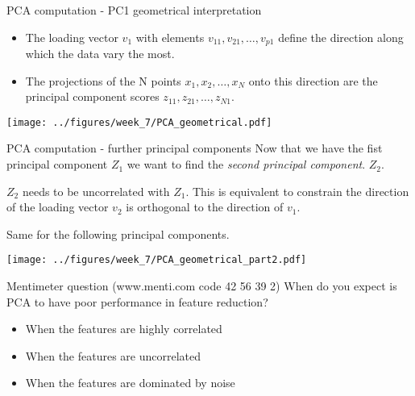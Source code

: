 \documentclass[notes]{beamer}          %
\begin{document}
\begin{frame}{PCA computation - PC1 geometrical interpretation}
\begin{itemize}
\item The loading vector $v_1$ with elements $v_{11}, v_{21}, \dots, v_{p1}$ define the direction along which the data vary the most.
\item The projections of the N points $x_1, x_2, \dots, x_N$ onto this direction are the principal component scores $z_{11}, z_{21}, \dots, z_{N1}$.
\end{itemize}

\begin{center}
\texttt{[image: ../figures/week\_7/PCA\_geometrical.pdf]}  
\end{center}
\end{frame}

\begin{frame}{PCA computation - further principal components}
Now that we have the fist principal component $Z_1$ we want to find the \textit{second principal component}. $Z_2$. 

\vspace{2mm} 

$Z_2$ needs to be uncorrelated with $Z_1$. This is equivalent to constrain the direction of the loading vector $v_2$  is orthogonal to the direction of $v_1$.

\vspace{2mm} 
 
 Same for the following principal components.
 
 \begin{center}
\texttt{[image: ../figures/week\_7/PCA\_geometrical\_part2.pdf]}  
\end{center}
 

\end{frame}

\begin{frame}{Mentimeter question (www.menti.com code 42 56 39 2)}
When do you expect is PCA to have poor performance in feature reduction?
\begin{itemize}
\item When the features are highly correlated
\item When the features are uncorrelated
\item When the features are dominated by noise
\end{itemize}
\end{frame}
\end{document}
